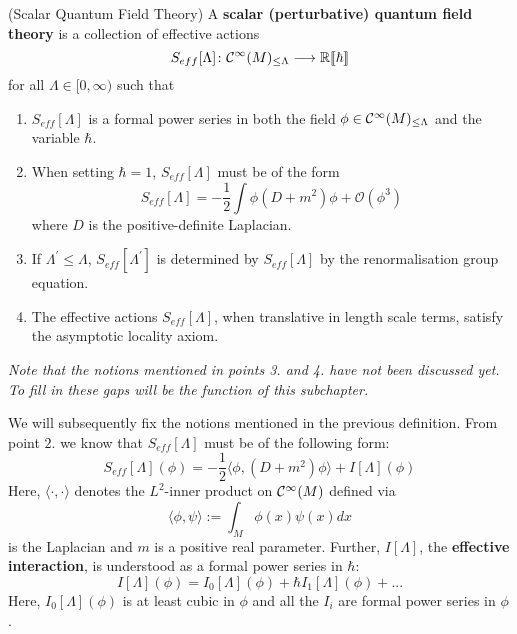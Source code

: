 \begin{definition}(Scalar Quantum Field Theory)
\label{def:scalar_qft}
  A \textbf{scalar (perturbative) quantum field theory} is a collection of effective actions
  \begin{equation}S_{eff}[\Lambda]\colon \mathcal{C}^{\infty}(M)_{\leq \Lambda} \longrightarrow \mathbb{R}\llbracket\hbar\rrbracket\end{equation}
  for all $\Lambda \in [0,\infty)$ such that
  \begin{enumerate}
    \item $S_{eff}[\Lambda]$ is a formal power series in both the field $\phi \in \Ci(M)_{\leq \Lambda}$ and the variable $\hbar$.

    \item When setting $\hbar = 1$, $S_{eff}[\Lambda]$ must be of the form
    \begin{equation}S_{eff}[\Lambda] = - \frac{1}{2} \int \phi (D + m^2) \phi + \mathcal{O}(\phi^3)\end{equation}
    where $D$ is the positive-definite Laplacian.

    \item If $\Lambda^\prime \leq \Lambda$, $S_{eff}[\Lambda^\prime]$ is determined by $S_{eff}[\Lambda]$ by the renormalisation group equation.

    \item The effective actions $S_{eff}[\Lambda]$, when translative in length scale terms, satisfy the asymptotic locality axiom.
  \end{enumerate}
  \emph{Note that the notions mentioned in points 3. and 4. have not been discussed yet. To fill in these gaps will be the function of this subchapter.}
\end{definition}

We will subsequently fix the notions mentioned in the previous definition. From point $2.$ we know that $S_{eff}[\Lambda]$ must be of the following form:
\begin{equation}S_{eff}[\Lambda](\phi) = - \frac{1}{2} \langle \phi, (D+m^2)\phi \rangle + I[\Lambda](\phi)\end{equation}
Here, $\langle \cdot , \cdot \rangle$ denotes the $L^2$-inner product on $\mathcal{C}^{\infty}(M)$ defined via
\begin{equation}
  \langle \phi , \psi \rangle := \int_M \phi(x) \psi(x) dx
\end{equation}
is the Laplacian and $m$ is a positive real parameter. Further, $I[\Lambda]$, the \textbf{effective interaction}, is understood as a formal power series in $\hbar$:
\begin{equation} I[\Lambda](\phi) = I_0[\Lambda](\phi) + \hbar I_1[\Lambda](\phi) + ...\end{equation}
Here, $I_0[\Lambda](\phi)$ is at least cubic in $\phi$ and all the $I_i$ are formal power series in $\phi$.\\

